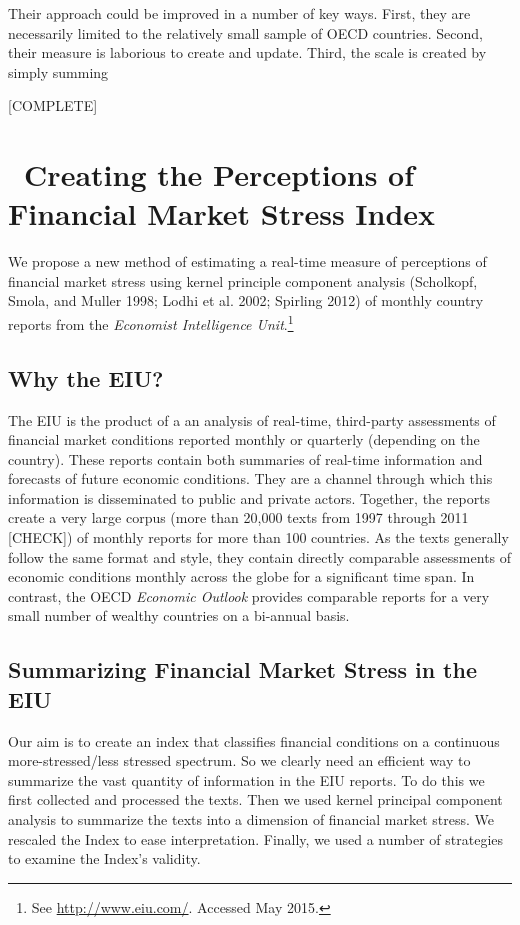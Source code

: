 \documentclass[]{article}
\let\rmarkdownfootnote\footnote%
\def\footnote{\protect\rmarkdownfootnote}
\begin{document}
Their approach could be improved in a number of key ways. First, they
are necessarily limited to the relatively small sample of OECD
countries. Second, their measure is laborious to create and update.
Third, the scale is created by simply summing

{[}COMPLETE{]}

\section{~Creating the Perceptions of Financial Market Stress
Index}\label{creating-the-perceptions-of-financial-market-stress-index}

We propose a new method of estimating a real-time measure of perceptions
of financial market stress using kernel principle component analysis
(Scholkopf, Smola, and Muller 1998; Lodhi et al. 2002; Spirling 2012) of
monthly country reports from the \emph{Economist Intelligence
Unit}.\footnote{See \url{http://www.eiu.com/}. Accessed May 2015.}

\subsection{Why the EIU?}\label{why-the-eiu}

The EIU is the product of a an analysis of real-time, third-party
assessments of financial market conditions reported monthly or quarterly
(depending on the country). These reports contain both summaries of
real-time information and forecasts of future economic conditions. They
are a channel through which this information is disseminated to public
and private actors. Together, the reports create a very large corpus
(more than 20,000 texts from 1997 through 2011 {[}CHECK{]}) of monthly
reports for more than 100 countries. As the texts generally follow the
same format and style, they contain directly comparable assessments of
economic conditions monthly across the globe for a significant time
span. In contrast, the OECD \emph{Economic Outlook} provides comparable
reports for a very small number of wealthy countries on a bi-annual
basis.

\subsection{Summarizing Financial Market Stress in the
EIU}\label{summarizing-financial-market-stress-in-the-eiu}

Our aim is to create an index that classifies financial conditions on a
continuous more-stressed/less stressed spectrum. So we clearly need an
efficient way to summarize the vast quantity of information in the EIU
reports. To do this we first collected and processed the texts. Then we
used kernel principal component analysis to summarize the texts into a
dimension of financial market stress. We rescaled the Index to ease
interpretation. Finally, we used a number of strategies to examine the
Index's validity.
\end{document}
